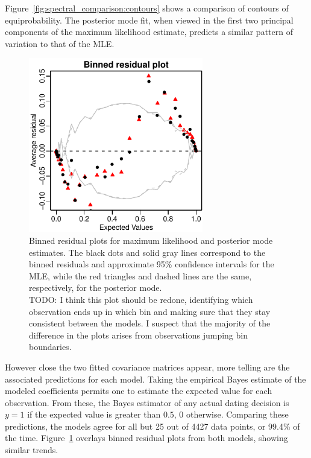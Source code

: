 \documentclass[10pt]{article}
\begin{document}
Figure~\ref{fig:spectral_comparison:contours} shows a comparison of contours of
equiprobability. The posterior mode fit, when viewed in the first two
principal components of the maximum likelihood estimate, predicts a
similar pattern of variation to that of the MLE.

\begin{figure}
\begin{center}
\includegraphics[width=3in]{binned_residuals.pdf}
\end{center}
\caption{Binned residual plots for maximum likelihood and posterior
  mode estimates. The black dots and solid gray lines correspond to
  the binned residuals and approximate 95\% confidence intervals for
  the MLE, while the red triangles and dashed lines are the same, respectively, for
  the posterior mode. \\
TODO: I think this plot should be redone, identifying which
observation ends up in which bin and making sure that they stay
consistent between the models. I suspect that the majority of the
difference in the plots arises from observations jumping bin boundaries.}
\label{fig:binned_residuals}
\end{figure}

However close the two fitted covariance matrices appear, more telling
are the associated predictions for each model. Taking the empirical
Bayes estimate of the modeled coefficients permits one to estimate the
expected value for each observation. From these, the Bayes estimator
of any actual dating decision is $y=1$ if the expected value is
greater than $0.5$, $0$ otherwise. Comparing these
predictions, the models agree for all but 25 out of 4427 data points,
or 99.4\% of the time. Figure~\ref{fig:binned_residuals} overlays binned
residual plots from both models, showing similar trends.
\end{document}
